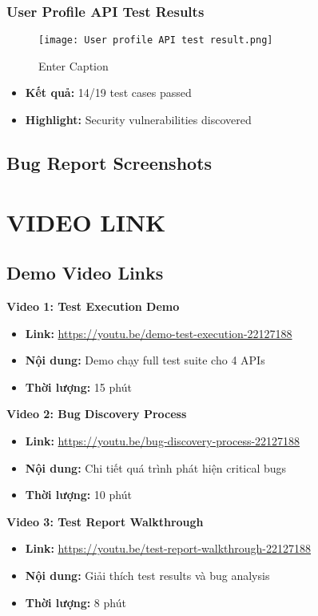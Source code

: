\documentclass[12pt,a4paper]{article}
\begin{document}
  \subsubsection{User Profile API Test Results}
  \begin{figure}[H]
      \centering
      \texttt{[image: User profile API test result.png]}
      \caption{Enter Caption}
  \end{figure}
  \begin{itemize}
  \item \textbf{Kết quả:} 14/19 test cases passed
  \item \textbf{Highlight:} Security vulnerabilities discovered
  \end{itemize}

  \subsection{Bug Report Screenshots}

  \section{VIDEO LINK}

  \subsection{Demo Video Links}

  \textbf{Video 1: Test Execution Demo}
  \begin{itemize}
  \item \textbf{Link:} \url{https://youtu.be/demo-test-execution-22127188}
  \item \textbf{Nội dung:} Demo chạy full test suite cho 4 APIs
  \item \textbf{Thời lượng:} 15 phút
  \end{itemize}

  \textbf{Video 2: Bug Discovery Process}
  \begin{itemize}
  \item \textbf{Link:} \url{https://youtu.be/bug-discovery-process-22127188}
  \item \textbf{Nội dung:} Chi tiết quá trình phát hiện critical bugs
  \item \textbf{Thời lượng:} 10 phút
  \end{itemize}

  \textbf{Video 3: Test Report Walkthrough}
  \begin{itemize}
  \item \textbf{Link:} \url{https://youtu.be/test-report-walkthrough-22127188}
  \item \textbf{Nội dung:} Giải thích test results và bug analysis
  \item \textbf{Thời lượng:} 8 phút
  \end{itemize}
\end{document}
